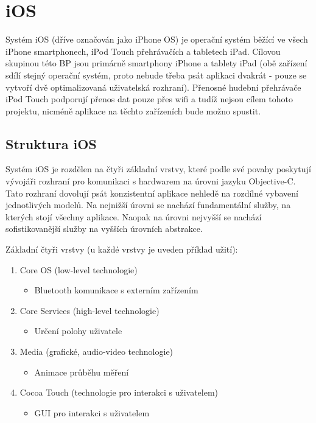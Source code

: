 \section{iOS}
Systém iOS (dříve označován jako iPhone OS) je operační systém běžící ve všech iPhone smartphonech, iPod Touch přehrávačích a tabletech iPad. Cílovou skupinou této BP jsou primárně smartphony iPhone a tablety iPad (obě zařízení sdílí stejný operační systém, proto nebude třeba psát aplikaci dvakrát - pouze se vytvoří dvě optimalizovaná uživatelská rozhraní). Přenosné hudební přehrávače iPod Touch podporují přenos dat pouze přes wifi a tudíž nejsou cílem tohoto projektu, nicméně aplikace na těchto zařízeních bude možno spustit.

\subsection{Struktura iOS}
Systém iOS je rozdělen na čtyři základní vrstvy, které podle své povahy poskytují vývojáři rozhraní pro komunikaci s hardwarem na úrovni jazyku Objective-C. Tato rozhraní dovolují psát konzistentní aplikace nehledě na rozdílné vybavení jednotlivých modelů. Na nejnižší úrovni se nachází fundamentální služby, na kterých stojí všechny aplikace. Naopak na úrovni nejvyšší se nachází sofistikovanější služby na vyšších úrovních abstrakce.

Základní čtyři vrstvy (u každé vrstvy je uveden příklad užití):
\begin{enumerate}
	\item Core OS (low-level technologie)
	\begin{itemize}
		\item Bluetooth komunikace s externím zařízením
	\end{itemize}
	\item Core Services (high-level technologie)
	\begin{itemize}
		\item Určení polohy uživatele
	\end{itemize}
	\item Media (grafické, audio-video technologie)
	\begin{itemize}
		\item Animace průběhu měření
	\end{itemize}
	\item Cocoa Touch (technologie pro interakci s uživatelem)
	\begin{itemize}
		\item GUI pro interakci s uživatelem
	\end{itemize}
\end{enumerate}

